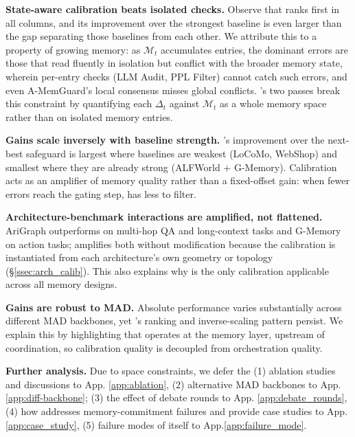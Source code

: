  \textbf{State-aware calibration beats isolated checks.} Observe that \system ranks first in all columns, and its improvement over the strongest baseline is even larger than the gap separating those baselines from each other. We attribute this to a property of growing memory: as $\mathcal{M}_t$ accumulates entries, the dominant errors are those that read fluently in isolation but conflict with the broader memory state, wherein per-entry checks (LLM Audit, PPL Filter) cannot catch such errors, and even A-MemGuard's local consensus misses global conflicts. \system's two passes break this constraint by quantifying each $\Delta_t$ against $\mathcal{M}_t$ as a whole memory space rather than on isolated memory entries.

 \textbf{Gains scale inversely with baseline strength.} \system's improvement over the next-best safeguard is largest where baselines are weakest (LoCoMo, WebShop) and smallest where they are already strong (ALFWorld + G-Memory). Calibration acts as an amplifier of memory quality rather than a fixed-offset gain: when fewer errors reach the gating step, \system has less to filter.

 \textbf{Architecture-benchmark interactions are amplified, not flattened.} AriGraph outperforms on multi-hop QA and long-context tasks and G-Memory on action tasks; \system amplifies both without modification because the calibration is instantiated from each architecture's own geometry or topology (\S\ref{ssec:arch_calib}). This also explains why \system is the only calibration applicable across all memory designs.

 \textbf{Gains are robust to MAD.} Absolute performance varies substantially across different MAD backbones, yet \system's ranking and inverse-scaling pattern persist. We explain this by highlighting that \system operates at the memory layer, upstream of coordination, so calibration quality is decoupled from orchestration quality.

 \textbf{Further analysis.} Due to space constraints, we defer the (1) ablation studies and discussions to App. \ref{app:ablation}, (2) alternative MAD backbones to App. \ref{app:diff-backbone}; (3) the effect of debate rounds to App. \ref{app:debate_rounds}, (4) how \system addresses memory-commitment failures and provide case studies to App.\ref{app:case_study}, (5) failure modes of \system itself to App.\ref{app:failure_mode}.























